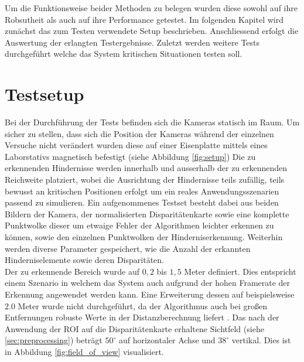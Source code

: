 Um die Funktionsweise beider Methoden zu belegen wurden diese sowohl auf ihre Robsutheit als auch auf ihre Performance getestet. Im folgenden Kapitel wird zunächst das zum Testen verwendete Setup beschrieben. Anschliessend erfolgt die Auswertung der erlangten Testergebnisse. Zuletzt werden weitere Tests durchgeführt welche das System kritischen Situationen testen soll.

\section{Testsetup}
\label{sec:test_setup}

Bei der Durchführung der Tests befinden sich die Kameras statisch im Raum. Um sicher zu stellen, dass sich die Position der Kameras während der einzelnen Versuche nicht verändert wurden diese auf einer Eisenplatte mittels eines Laborstativs magnetisch befestigt (siehe Abbildung \ref{fig:setup}) Die zu erkennenden Hindernisse werden innerhalb und ausserhalb der zu erkennenden Reichweite platziert, wobei die Ausrichtung der Hindernisse teils zufällig, teils bewusst an kritischen Positionen erfolgt um ein reales Anwendungsszenarien passend zu simulieren. Ein aufgenommenes Testset besteht dabei aus beiden Bildern der Kamera, der normalisierten Disparitätenkarte sowie eine komplette Punktwolke dieser um etwaige Fehler der Algorithmen leichter erkennen zu können, sowie den einzelnen Punktwolken der Hinderniserkennung. Weiterhin werden diverse Parameter gespeichert, wie die Anzahl der erkannten Hinderniselemente sowie deren Disparitäten.\\


\noindent
Der zu erkennende Bereich wurde auf $0,2$ bis $1,5$ Meter definiert. Dies entspricht einem Szenario in welchem das System auch aufgrund der hohen Framerate der Erkennung angewendet werden kann. Eine Erweiterung dessen auf beispielsweise $2.0$ Meter wurde nicht durchgeführt, da der Algorithmus auch bei großen Entfernungen robuste Werte in der Distanzberechnung liefert \cite{hilleralhallak}. Das nach der Anwendung der ROI auf die Disparitätenkarte erhaltene Sichtfeld (siehe \ref{sec:preprocessing}) beträgt $50^{\circ}$ auf horizontaler Achse und $38^{\circ}$ vertikal. Dies ist in Abbildung \ref{fig:field_of_view} visualisiert.
	
